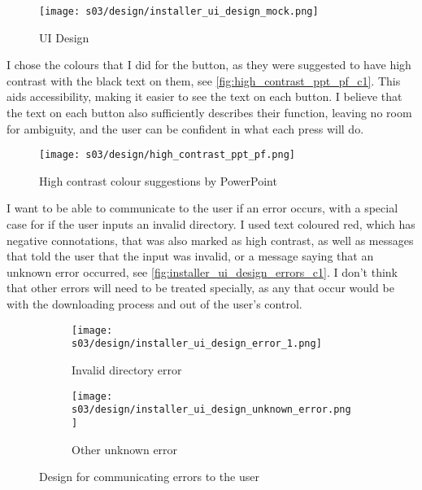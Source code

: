         \begin{figure}[!ht]
            \centering
            \texttt{[image: s03/design/installer\_ui\_design\_mock.png]}
            \caption{UI Design}
            \label{fig:installer_gui_design_c1}
        \end{figure}

        I chose the colours that I did for the button, as they were suggested to have high contrast with the black text on them, see \autoref{fig:high_contrast_ppt_pf_c1}. 
        This aids accessibility, making it easier to see the text on each button. 
        I believe that the text on each button also sufficiently describes their function, leaving no room for ambiguity, and the user can be confident in what each press will do. 

        \begin{figure}[!ht]
            \centering
            \texttt{[image: s03/design/high\_contrast\_ppt\_pf.png]}
            \caption{High contrast colour suggestions by PowerPoint}
            \label{fig:high_contrast_ppt_pf_c1}
        \end{figure}

        I want to be able to communicate to the user if an error occurs, with a special case for if the user inputs an invalid directory. 
        I used text coloured red, which has negative connotations, that was also marked as high contrast, as well as messages that told the user that the input was invalid, or a message saying that an unknown error occurred, see \autoref{fig:installer_ui_design_errors_c1}. 
        I don't think that other errors will need to be treated specially, as any that occur would be with the downloading process and out of the user's control.

        \begin{figure}[!ht]
            \begin{subfigure}{.5\textwidth}
                \centering
                \texttt{[image: s03/design/installer\_ui\_design\_error\_1.png]}
                \caption{Invalid directory error}
                \label{fig:installer_ui_design_directory_error}
            \end{subfigure}%
            \begin{subfigure}{.5\textwidth}
                \centering
                \texttt{[image: s03/design/installer\_ui\_design\_unknown\_error.png]}
                \caption{Other unknown error}
                \label{fig:installer_ui_design_other_error}
            \end{subfigure}%
            \caption{Design for communicating errors to the user}
            \label{fig:installer_ui_design_errors_c1}
        \end{figure}

